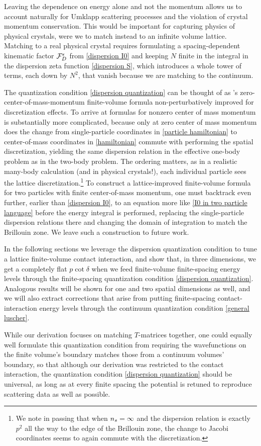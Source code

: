 Leaving the dependence on energy alone and not the momentum allows us to account naturally for Umklapp scattering processes and the violation of crystal momentum conservation.
This would be important for capturing physics of physical crystals, were we to match instead to an infinite volume lattice.
Matching to a real physical crystal requires formulating a spacing-dependent kinematic factor $\mathcal{F}_D^\epsilon$ from \eqref{dispersion I0} and keeping $N$ finite in the integral in the dispersion zeta function \eqref{dispersion S}, which introduces a whole tower of terms, each down by $N^2$, that vanish because we are matching to the continuum.

The quantization condition \eqref{dispersion quantization} can be thought of as \Luscher's zero-center-of-mass-momentum finite-volume formula non-perturbatively improved for discretization effects.
To arrive at formulas for nonzero center of mass momentum is substantially more complicated, because only at zero center of mass momentum does the change from single-particle coordinates in \eqref{particle hamiltonian} to center-of-mass coordinates in \eqref{hamiltonian} commute with performing the spatial discretization, yielding the same dispersion relation in the effective one-body problem as in the two-body problem.
The ordering matters, as in a realistic many-body calculation (and in physical crystals!), each individual particle sees the lattice discretization.\footnote{
We note in passing that when ${n_s}=\infty$ and the dispersion relation is exactly $p^2$ all the way to the edge of the Brillouin zone, the change to Jacobi coordinates seems to again commute with the discretization.}
To construct a lattice-improved finite-volume formula for two particles with finite center-of-mass momentum, one must backtrack even further, earlier than \eqref{dispersion I0}, to an equation more like \eqref{I0 in two particle language} before the energy integral is performed, replacing the single-particle dispersion relations there and changing the domain of integration to match the Brillouin zone.
We leave such a construction to future work.

In the following sections we leverage the dispersion quantization condition to tune a lattice finite-volume contact interaction, and show that, in three dimensions, we get a completely flat $p \cot \delta$ when we feed finite-volume finite-spacing energy levels through the finite-spacing quantization condition \eqref{dispersion quantization}.
Analogous results will be shown for one and two spatial dimensions as well, and we will also extract corrections that arise from putting finite-spacing contact-interaction energy levels through the continuum quantization condition \eqref{general luscher}.

While our derivation focuses on matching $T$-matrices together, one could equally well formulate this quantization condition from requiring the wavefunctions on the finite volume's boundary matches those from a continuum volumes' boundary, so that although our derivation was restricted to the contact interaction, the quantization condition \eqref{dispersion quantization} should be universal, as long as at every finite spacing the potential is retuned to reproduce scattering data as well as possible.
